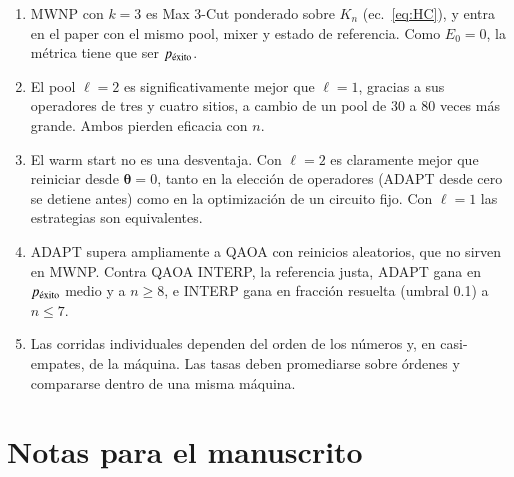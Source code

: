 \documentclass[11pt,a4paper]{article}
\newcommand{\pex}{p_{\rm \acute{e}xito}}
\begin{document}
\begin{enumerate}
\item MWNP con $k=3$ es Max 3-Cut ponderado sobre $K_n$ (ec.~\ref{eq:HC}), y entra en el paper con
  el mismo pool, mixer y estado de referencia. Como $E_0=0$, la métrica tiene que ser $\pex$.
\item El pool $\ell=2$ es significativamente mejor que $\ell=1$, gracias a sus operadores de tres
  y cuatro sitios, a cambio de un pool de 30 a 80 veces más grande. Ambos pierden eficacia con
  $n$.
\item El warm start no es una desventaja. Con $\ell=2$ es claramente mejor que reiniciar desde
  $\bm\theta=0$, tanto en la elección de operadores (ADAPT desde cero se detiene antes) como en la
  optimización de un circuito fijo. Con $\ell=1$ las estrategias son equivalentes.
\item ADAPT supera ampliamente a QAOA con reinicios aleatorios, que no sirven en MWNP. Contra QAOA
  INTERP, la referencia justa, ADAPT gana en $\pex$ medio y a $n\geq8$, e INTERP gana en fracción
  resuelta (umbral 0.1) a $n\leq7$.
\item Las corridas individuales dependen del orden de los números y, en casi-empates, de la
  máquina. Las tasas deben promediarse sobre órdenes y compararse dentro de una misma máquina.
\end{enumerate}

\section{Notas para el manuscrito}
\label{sec:notas}
\end{document}
